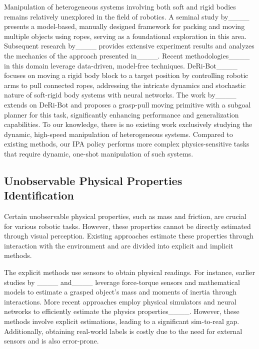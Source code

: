 Manipulation of heterogeneous systems involving both soft and rigid bodies remains relatively unexplored in the field of robotics. A seminal study by____ presents a model-based, manually designed framework for packing and moving multiple objects using ropes, serving as a foundational exploration in this area. Subsequent research by____ provides extensive experiment results and analyzes the mechanics of the approach presented in____. Recent methodologies____ in this domain leverage data-driven, model-free techniques. DeRi-Bot____ focuses on moving a rigid body block to a target position by controlling robotic arms to pull connected ropes, addressing the intricate dynamics and stochastic nature of soft-rigid body systems with neural networks. The work by____ extends on DeRi-Bot and proposes a grasp-pull moving primitive with a subgoal planner for this task, significantly enhancing performance and generalization capabilities. To our knowledge, there is no existing work exclusively studying the dynamic, high-speed manipulation of heterogeneous systems. Compared to existing methods, our IPA policy performs more complex physics-sensitive tasks that require dynamic, one-shot manipulation of such systems. 

\subsection{Unobservable Physical Properties Identification}
\label{subsec:upps}
Certain unobservable physical properties, such as mass and friction, are crucial for various robotic tasks. However, these properties cannot be directly estimated through visual perception. Existing approaches estimate these properties through interaction with the environment and are divided into explicit and implicit methods.

The explicit methods use sensors to obtain physical readings. For instance, earlier studies by ____ and____ leverage force-torque sensors and mathematical models to estimate a grasped object's mass and moments of inertia through interactions. More recent approaches employ physical simulators and neural networks to efficiently estimate the physics properties____. However, these methods involve explicit estimations, leading to a significant sim-to-real gap. Additionally, obtaining real-world labels is costly due to the need for external sensors and is also error-prone.

